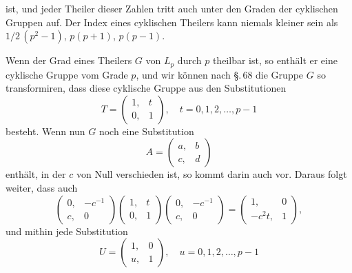 ist, und jeder Theiler dieser Zahlen tritt auch unter den Graden der cyklischen Gruppen auf. Der Index eines cyklischen Theilers kann niemals kleiner sein als $1/2\,(p^2-1)$, $p(p+1)$, $p(p-1)$.

Wenn der Grad eines Theilers $G$ von $L_p$ durch $p$ theilbar ist, so enthält er eine cyklische Gruppe vom Grade $p$, und wir können nach \S.\,68 die Gruppe $G$ so transformiren, dass diese cyklische Gruppe aus den Substitutionen
\[
T = \begin{pmatrix}1, & t\\ 0, & 1\end{pmatrix}, \quad t = 0, 1, 2, \ldots, p-1
\]
besteht. Wenn nun $G$ noch eine Substitution
\[
A = \begin{pmatrix}a, & b\\ c, & d\end{pmatrix}
\]
enthält, in der $c$ von Null verschieden ist, so kommt darin auch
vor. Daraus folgt weiter, dass auch
\[
\begin{pmatrix}0, & -c^{-1}\\ c, & 0\end{pmatrix}\begin{pmatrix}1, & t\\ 0, & 1\end{pmatrix}\begin{pmatrix}0, & -c^{-1}\\ c, & 0\end{pmatrix} = \begin{pmatrix}1, & 0\\ -c^2 t, & 1\end{pmatrix},
\]
und mithin jede Substitution
\[
U = \begin{pmatrix}1, & 0\\ u, & 1\end{pmatrix}, \quad u = 0, 1, 2, \ldots, p-1
\]

